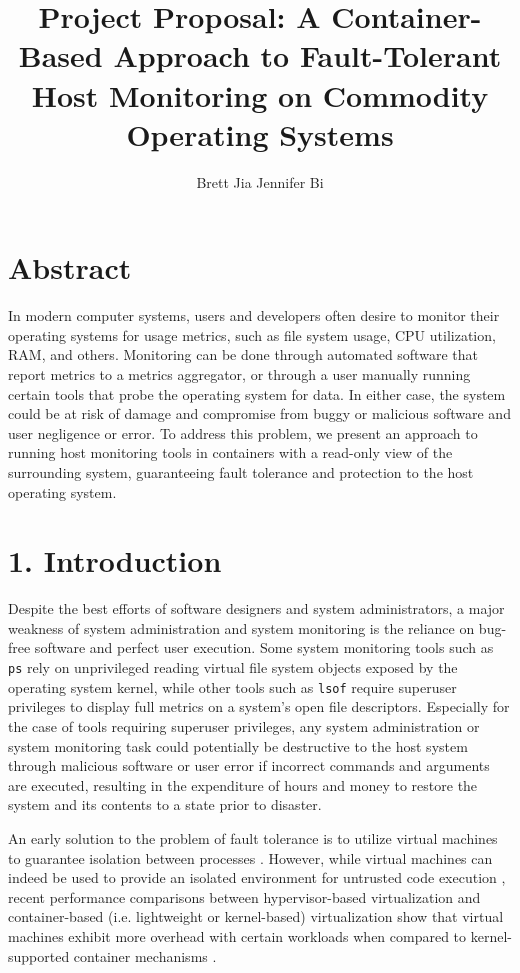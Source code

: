 \documentclass{proc}
\begin{document}
\title{Project Proposal: A Container-Based Approach to Fault-Tolerant Host Monitoring on Commodity Operating Systems}

\author{Brett Jia \hspace{1em} Jennifer Bi}

\maketitle

\section*{Abstract}

In modern computer systems, users and developers often desire to monitor their operating systems for usage metrics, such as file system usage, CPU utilization, RAM, and others. Monitoring can be done through automated software that report metrics to a metrics aggregator, or through a user manually running certain tools that probe the operating system for data. In either case, the system could be at risk of damage and compromise from buggy or malicious software and user negligence or error. To address this problem, we present an approach to running host monitoring tools in containers with a read-only view of the surrounding system, guaranteeing fault tolerance and protection to the host operating system.

\section*{1. Introduction}

Despite the best efforts of software designers and system administrators, a major weakness of system administration and system monitoring is the reliance on bug-free software and perfect user execution. Some system monitoring tools such as \texttt{ps} rely on unprivileged reading virtual file system objects exposed by the operating system kernel, while other tools such as \texttt{lsof} require superuser privileges to display full metrics on a system's open file descriptors. Especially for the case of tools requiring superuser privileges, any system administration or system monitoring task could potentially be destructive to the host system through malicious software or user error if incorrect commands and arguments are executed, resulting in the expenditure of hours and money to restore the system and its contents to a state prior to disaster.

An early solution to the problem of fault tolerance is to utilize virtual machines to guarantee isolation between processes \cite{garfinkel2003terra}. However, while virtual machines can indeed be used to provide an isolated environment for untrusted code execution \cite{wen2012virtualization}, recent performance comparisons between hypervisor-based virtualization and container-based (i.e. lightweight or kernel-based) virtualization show that virtual machines exhibit more overhead with certain workloads when compared to kernel-supported container mechanisms \cite{felter2014docker, morabito2015hypervisors}.
\end{document}
